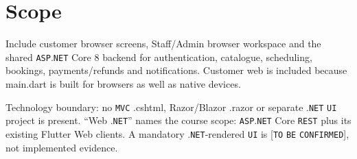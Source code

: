 \clearpage
\section{Scope}\label{sec:srs-3}
Include customer browser screens, Staff/\allowbreak{}Admin browser workspace and the shared \texttt{ASP}.\texttt{NET} Core 8 backend for authentication, catalogue, scheduling, bookings, payments/\allowbreak{}refunds and notifications. Customer web is included because main.dart is built for browsers as well as native devices.

Technology boundary: no \texttt{MVC} .cshtml, Razor/\allowbreak{}Blazor .razor or separate .\texttt{NET} \texttt{UI} project is present. “Web .\texttt{NET}” names the course scope: \texttt{ASP}.\texttt{NET} Core \texttt{REST} plus its existing Flutter Web clients. A mandatory .\texttt{NET}-rendered \texttt{UI} is [\texttt{TO} \texttt{BE} \texttt{CONFIRME\allowbreak{}D}], not implemented evidence.
